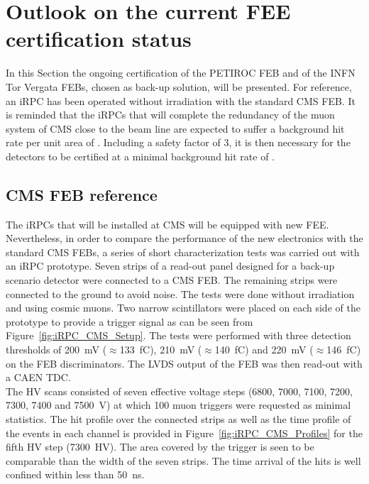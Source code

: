 	\section{Outlook on the current FEE certification status}
	\label{chapt6:sec:outlooks}
	
	In this Section the ongoing certification of the PETIROC FEB and of the INFN Tor Vergata FEBs, chosen as back-up solution, will be presented. For reference, an iRPC has been operated without irradiation with the standard CMS FEB. It is reminded that the iRPCs that will complete the redundancy of the muon system of CMS close to the beam line are expected to suffer a background hit rate per unit area of . Including a safety factor of 3, it is then necessary for the detectors to be certified at a minimal background hit rate of .
	
		\subsection{CMS \acl{FEB} reference}
		\label{chapt6:ssec:CMSFEBref}
    
    The iRPCs that will be installed at CMS will be equipped with new \acl{FEE}. Nevertheless, in order to compare the performance of the new electronics with the standard CMS FEBs, a series of short characterization tests was carried out with an iRPC prototype. Seven strips of a read-out panel designed for a back-up scenario detector were connected to a CMS FEB. The remaining strips were connected to the ground to avoid noise. The tests were done without irradiation and using cosmic muons. Two narrow scintillators were placed on each side of the prototype to provide a trigger signal as can be seen from Figure~\ref{fig:iRPC_CMS_Setup}. The tests were performed with three detection thresholds of \SI{200}{mV} ($\approx$\SI{133}{fC}), \SI{210}{mV} ($\approx$\SI{140}{fC}) and \SI{220}{mV} ($\approx$\SI{146}{fC}) on the FEB discriminators. The LVDS output of the FEB was then read-out with a CAEN TDC.\\
    The HV scans consisted of seven effective voltage steps (6800, 7000, 7100, 7200, 7300, 7400 and \SI{7500}{V}) at which 100 muon triggers were requested as minimal statistics. The hit profile over the connected strips as well as the time profile of the events in each channel is provided in Figure~\ref{fig:iRPC_CMS_Profiles} for the fifth HV step (\SI{7300}{HV}). The area covered by the trigger is seen to be comparable than the width of the seven strips. The time arrival of the hits is well confined within less than \SI{50}{ns}.
		

